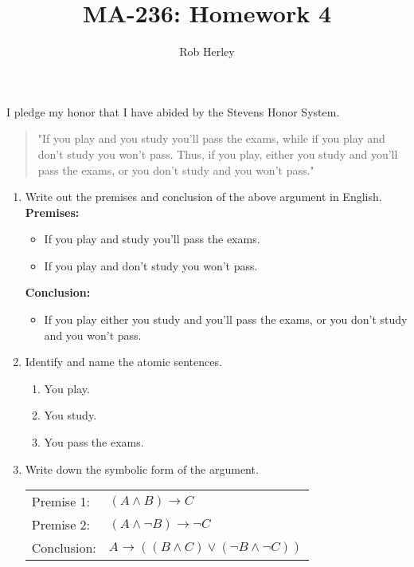 \documentclass[12pt]{article}
\begin{document}
\title{MA-236: Homework 4}
\author{Rob Herley}
\maketitle

\begin{center}
I pledge my honor that I have abided by the Stevens Honor System.
\end{center}

\begin{quotation}
  "If you play and you study you’ll pass the exams, while if you play and don’t study you won’t pass. Thus, if you play, either you study and you’ll pass the exams, or you don’t study and you won’t pass."
\end{quotation}


\begin{enumerate}
  \item Write out the premises and conclusion of the above argument in English. \\
  \textbf{Premises:} 
    \begin{itemize}
      \item If you play and study you'll pass the exams.
      \item If you play and don't study you won't pass.
    \end{itemize}
  \textbf{Conclusion:} 
    \begin{itemize}
      \item If you play either you study and you'll pass the exams, or you don't
      study and you won't pass.
    \end{itemize}
  \item Identify and name the atomic sentences.
  \begin{enumerate}[label=\textbf{\Alph*:}]
    \item You play.
    \item You study.
    \item You pass the exams.
  \end{enumerate}
  \item Write down the symbolic form of the argument.
  \begin{center}
    \begin{tabular}{ll}
    Premise 1: & $(A \land B) \rightarrow C$ \\
    Premise 2: & $(A \land \neg B) \rightarrow \neg C$ \\ \hline
    Conclusion: & $A \rightarrow ((B \land C) \lor (\neg B \land \neg C))$ \\

\end{tabular}
\end{center}
\end{enumerate}
\end{document}
